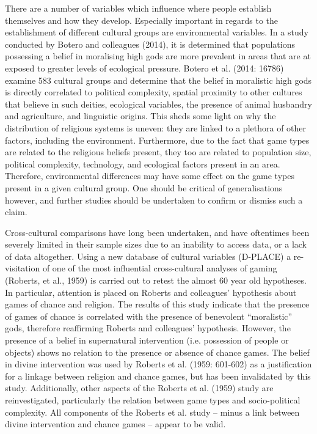 \documentclass[%
	]{ijsra}
\begin{document}
There are a number of variables which influence where people establish themselves and how they develop. Especially important in regards to the establishment of different cultural groups are environmental variables. In a study conducted by Botero and colleagues (2014), it is determined that populations possessing a belief in moralising high gods are more prevalent in areas that are at exposed to greater levels of ecological pressure. Botero et al. (2014: 16786) examine 583 cultural groups and determine that the belief in moralistic high gods is directly correlated to political complexity, spatial proximity to other cultures that believe in such deities, ecological variables, the presence of animal husbandry and agriculture, and linguistic origins. This sheds some light on why the distribution of religious systems is uneven: they are linked to a plethora of other factors, including the environment.%
 Furthermore, due to the fact that game types are related to the religious beliefs present, they too are related to population size, political complexity, technology, and ecological factors present in an area. Therefore, environmental differences may have some effect on the game types present in a given cultural group. One should be critical of generalisations however, and further studies should be undertaken to confirm or dismiss such a claim.




Cross-cultural comparisons have long been undertaken, and have oftentimes been severely limited in their sample sizes due to an inability to access data, or a lack of data altogether. Using a new database of cultural variables (D-PLACE) a re-visitation of one of the most influential cross-cultural analyses of gaming (Roberts, et al., 1959) is carried out to retest the almost 60 year old hypotheses. In particular, attention is placed on Roberts and colleagues’ hypothesis about games of chance and religion. The results of this study indicate that the presence of games of chance is correlated with the presence of benevolent “moralistic” gods, therefore reaffirming Roberts and colleagues’ hypothesis. However, the presence of a belief in supernatural intervention (i.e. possession of people or objects) shows no relation to the presence or absence of chance games. The belief in divine intervention was used by Roberts et al. (1959: 601-602) as a justification for a linkage between religion and chance games, but has been invalidated by this study. Additionally, other aspects of the Roberts et al. (1959) study are reinvestigated, particularly the relation between game types and socio-political complexity. All components of the Roberts et al. study – minus a link between divine intervention and chance games – appear to be valid.
\end{document}
